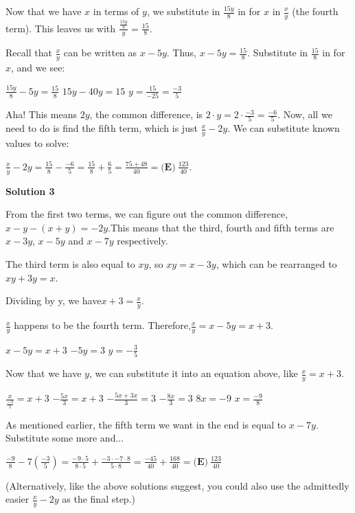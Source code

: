 \begin{enumerate}
 Now that we have $x$ in terms of $y$, we substitute in $\frac{15y}{8}$ in for $x$ in $\frac{x}{y}$ (the fourth term). This leaves us with $\frac{\frac{15y}{8}}{y} = \frac{15}{8}$. 

 Recall that $\frac{x}{y}$ can be written as $x - 5y$. Thus, $x - 5y = \frac{15}{8}$. Substitute in $\frac{15}{8}$ in for $x$, and we see:

 $\frac{15y}{8} - 5y = \frac{15}{8}$
$15y - 40y = 15$
$y = \frac{15}{-25} = \frac{-3}{5}$

 Aha! This means $2y$, the common difference, is $2\cdot y = 2\cdot \frac{-3}{5} = \frac{-6}{5}$. Now, all we need to do is find the fifth term, which is just $\frac{x}{y}-2y$. We can substitute known values to solve: 

 $\frac{x}{y}-2y = \frac{15}{8} - \frac{-6}{5} = \frac{15}{8} + \frac{6}{5} = \frac{75 + 48}{40} = \boxed{\textbf{(E)}\ \frac{123}{40}}$.

 


 



\textbf{Solution 3}

From the first two terms, we can figure out the common difference, $x-y-(x+y)=-2y$.This means that the third, fourth and fifth terms are $x-3y$, $x-5y$ and $x-7y$ respectively.

 The third term is also equal to $xy$, so $xy=x-3y$, which can be rearranged to $xy+3y=x$.

 Dividing by y, we have$x+3=\frac{x}{y}$.

 $\frac{x}{y}$ happens to be the fourth term. Therefore,$\frac{x}{y}=x-5y=x+3$.

 $x-5y=x+3$
$-5y=3$
$y=-\frac{3}{5}$

 Now that we have $y$, we can substitute it into an equation above, like $\frac{x}{y}=x+3$.

 $\frac{x}{\frac{-3}{5}}=x+3$
$-\frac{5x}{3}=x+3$
$-\frac{5x+3x}{3}=3$
$-\frac{8x}{3}=3$
$8x=-9$
$x=\frac{-9}{8}$

 As mentioned earlier, the fifth term we want in the end is equal to $x-7y$. Substitute some more and...

 $\frac{-9}{8}-7(\frac{-3}{5})=\frac{-9\cdot5}{8\cdot5}+\frac{-3\cdot-7\cdot8}{5\cdot8}=\frac{-45}{40}+\frac{168}{40}=\boxed{\textbf{(E)}\ \frac{123}{40}}$

 (Alternatively, like the above solutions suggest, you could also use the admittedly easier $\frac{x}{y}-2y$ as the final step.)

 



\end{enumerate}
